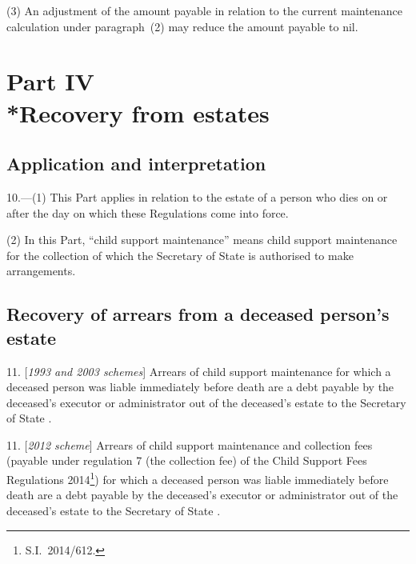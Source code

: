 \documentclass[12pt,a4paper]{article}
\begin{document}
(3) An adjustment of the amount payable in relation to the current maintenance calculation under paragraph~(2) may reduce the amount payable to nil.


\section[Part IV --- Recovery from estates]{Part IV\\*Recovery from estates}

\renewcommand\parthead{--- Part IV}

\subsection[10. Application and interpretation]{Application and interpretation}

10.---(1)  This Part applies in relation to the estate of a person who dies on or after the day on which these Regulations come into force.

(2) In this Part, “child support maintenance” means child support maintenance for the collection of which the 
Secretary of State  %
is authorised to make arrangements.


\subsection[11. Recovery of arrears from a deceased person’s estate]{Recovery of arrears from a deceased person’s estate}

11.  [\emph{1993 and 2003 schemes}] Arrears of child support maintenance for which a deceased person was liable immediately before death are a debt payable by the deceased’s executor or administrator out of the deceased’s estate to the 
Secretary of State%
.

11.  [\emph{2012 scheme}] Arrears of child support maintenance 
and collection fees (payable under regulation 7 (the collection fee) of the Child Support Fees Regulations 2014\footnote{S.I.~2014/612.})  %
for which a deceased person was liable immediately before death are a debt payable by the deceased’s executor or administrator out of the deceased’s estate to the 
Secretary of State%
.
\end{document}
